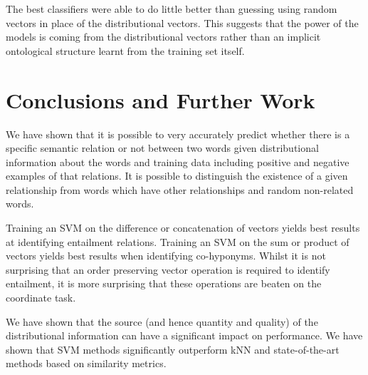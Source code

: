 \documentclass[11pt]{article}
\begin{document}
The best classifiers were able to do little better than guessing using random vectors in place of the distributional vectors.  This suggests that the power of the models is coming from the distributional vectors rather than an implicit ontological structure learnt from the training set itself.  


\section{Conclusions and Further Work}

We have shown that it is possible to very accurately predict whether there is a specific semantic relation or not between two words given distributional information about the words and training data including positive and negative examples of that relations.  It is possible to distinguish the existence of a given relationship from words which have other relationships and random non-related words.  

Training an SVM on the difference or concatenation of vectors yields best results at identifying entailment relations.  Training an SVM on the sum or product of vectors yields best results when identifying co-hyponyms.  Whilst it is not surprising that an order preserving vector operation is required to identify entailment, it is more surprising that these operations are beaten on the coordinate task.  

We have shown that the source (and hence quantity and quality) of the distributional information can have a significant impact on performance.  We have shown that SVM methods significantly outperform kNN and state-of-the-art methods based on similarity metrics. 











\end{document}
